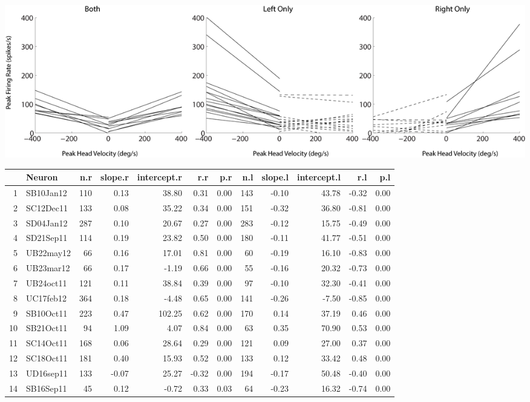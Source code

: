 \documentclass[]{article}
\begin{document}
\includegraphics{peakregressions.png}

\begin{table}[ht]
\centering
\begin{tabular}{rlrrrrrrrrrr}
  \hline
 & Neuron & n.r & slope.r & intercept.r & r.r & p.r & n.l & slope.l & intercept.l & r.l & p.l \\ 
  \hline
1 & SB10Jan12 & 110 & 0.13 & 38.80 & 0.31 & 0.00 & 143 & -0.10 & 43.78 & -0.32 & 0.00 \\ 
  2 & SC12Dec11 & 133 & 0.08 & 35.22 & 0.34 & 0.00 & 151 & -0.32 & 36.80 & -0.81 & 0.00 \\ 
  3 & SD04Jan12 & 287 & 0.10 & 20.67 & 0.27 & 0.00 & 283 & -0.12 & 15.75 & -0.49 & 0.00 \\ 
  4 & SD21Sep11 & 114 & 0.19 & 23.82 & 0.50 & 0.00 & 180 & -0.11 & 41.77 & -0.51 & 0.00 \\ 
  5 & UB22may12 &  66 & 0.16 & 17.01 & 0.81 & 0.00 &  60 & -0.19 & 16.10 & -0.83 & 0.00 \\ 
  6 & UB23mar12 &  66 & 0.17 & -1.19 & 0.66 & 0.00 &  55 & -0.16 & 20.32 & -0.73 & 0.00 \\ 
  7 & UB24oct11 & 121 & 0.11 & 38.84 & 0.39 & 0.00 &  97 & -0.10 & 32.30 & -0.41 & 0.00 \\ 
  8 & UC17feb12 & 364 & 0.18 & -4.48 & 0.65 & 0.00 & 141 & -0.26 & -7.50 & -0.85 & 0.00 \\ 
  9 & SB10Oct11 & 223 & 0.47 & 102.25 & 0.62 & 0.00 & 170 & 0.14 & 37.19 & 0.46 & 0.00 \\ 
  10 & SB21Oct11 &  94 & 1.09 & 4.07 & 0.84 & 0.00 &  63 & 0.35 & 70.90 & 0.53 & 0.00 \\ 
  11 & SC14Oct11 & 168 & 0.06 & 28.64 & 0.29 & 0.00 & 121 & 0.09 & 27.00 & 0.37 & 0.00 \\ 
  12 & SC18Oct11 & 181 & 0.40 & 15.93 & 0.52 & 0.00 & 133 & 0.12 & 33.42 & 0.48 & 0.00 \\ 
  13 & UD16sep11 & 133 & -0.07 & 25.27 & -0.32 & 0.00 & 194 & -0.17 & 50.48 & -0.40 & 0.00 \\ 
  14 & SB16Sep11 &  45 & 0.12 & -0.72 & 0.33 & 0.03 &  64 & -0.23 & 16.32 & -0.74 & 0.00 \\ 

\end{tabular}
\end{table}
\end{document}
